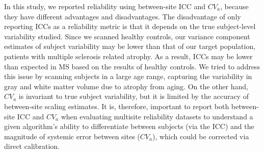 In this study, we reported reliability using between-site ICC and $CV_{a}$, because they have different advantages and disadvantages. The disadvantage of only reporting ICCs as a reliability metric is that it depends on the true subject-level variability studied. Since we scanned healthy controls, our variance component estimates of subject variability may be lower than that of our target population, patients with multiple sclerosis related atrophy. As a result, ICCs may be lower than expected in MS based on the results of healthy controls. We tried to address this issue by scanning subjects in a large age range, capturing the variability in gray and white matter volume due to atrophy from aging. On the other hand, $CV_{a}$ is invariant to true subject variability, but it is limited by the accuracy of between-site scaling estimates. It is, therefore, important to report both between-site ICC and $CV_{a}$ when evaluating multisite reliability datasets to understand a given algorithm's ability to differentiate between subjects (via the ICC) and the magnitude of systemic error between sites ($CV_{a}$), which could be corrected via direct calibration.